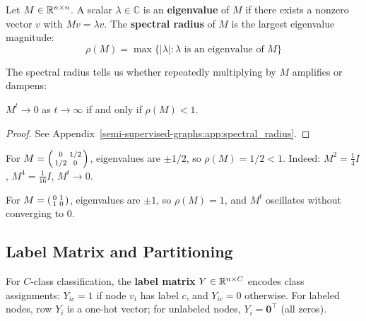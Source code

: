 \begin{notechapter}
\begin{definition}
\label{semi-supervised-graphs:def:spectral_radius}
Let $M \in \mathbb{R}^{n \times n}$. A scalar $\lambda \in \mathbb{C}$ is an
\textbf{eigenvalue} of $M$ if there exists a nonzero vector $v$ with
$Mv = \lambda v$. The \textbf{spectral radius} of $M$ is the largest
eigenvalue magnitude:
\begin{equation}
\rho(M) = \max\{|\lambda| : \lambda \text{ is an eigenvalue of } M\}
\end{equation}
\end{definition}

The spectral radius tells us whether repeatedly multiplying by $M$ amplifies
or dampens:

\begin{proposition}
\label{semi-supervised-graphs:prop:spectral_powers}
$M^t \to 0$ as $t \to \infty$ if and only if $\rho(M) < 1$.
\end{proposition}

\begin{proof}
See Appendix~\ref{semi-supervised-graphs:app:spectral_radius}.
\end{proof}

\begin{numericalexample}[title=Spectral Radius]
For $M = \begin{psmallmatrix} 0 & 1/2 \\ 1/2 & 0 \end{psmallmatrix}$,
eigenvalues are $\pm 1/2$, so $\rho(M) = 1/2 < 1$. Indeed:
$M^2 = \frac{1}{4}I$, $M^4 = \frac{1}{16}I$, $M^t \to 0$.

For $M = \begin{psmallmatrix} 0 & 1 \\ 1 & 0 \end{psmallmatrix}$,
eigenvalues are $\pm 1$, so $\rho(M) = 1$, and $M^t$ oscillates without
converging to 0.
\end{numericalexample}

\subsection{Label Matrix and Partitioning}

\begin{definition}
\label{semi-supervised-graphs:def:label_matrix}
For $C$-class classification, the \textbf{label matrix} $Y \in \mathbb{R}^{n \times C}$
encodes class assignments: $Y_{ic} = 1$ if node $v_i$ has label $c$, and
$Y_{ic} = 0$ otherwise. For labeled nodes, row $Y_i$ is a one-hot vector;
for unlabeled nodes, $Y_i = \mathbf{0}^\top$ (all zeros).
\end{definition}


\end{notechapter}
